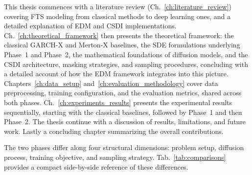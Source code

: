 This thesis commences with a literature review (Ch.~\ref{ch:literature_review}) covering FTS modeling from classical methods to deep learning ones, and a detailed explanation of EDM and CSDI implementations. Ch.~\ref{ch:theoretical_framework} then presents the theoretical framework: the classical GARCH-X and Merton-X baselines, the SDE formulations underlying Phase~1 and Phase~2, the mathematical foundations of diffusion models, and the CSDI architecture, masking strategies, and sampling procedures, concluding with a detailed account of how the EDM framework integrates into this picture. Chapters~\ref{ch:data_setup} and~\ref{ch:evaluation_methodology} cover data preprocessing, training configuration, and the evaluation metrics, shared across both phases. Ch.\ \ref{ch:experiments_results} presents the experimental results sequentially, starting with the classical baselines, followed by Phase~1 and then Phase~2. The thesis continue with a discussion of results, limitations, and future work. Lastly a concluding chapter summarizing the overall contributions.

% 

The two phases differ along four structural dimensions: problem setup, diffusion process, training objective, and sampling strategy. Tab.~\ref{tab:comparisons} provides a compact side-by-side reference of these differences.

